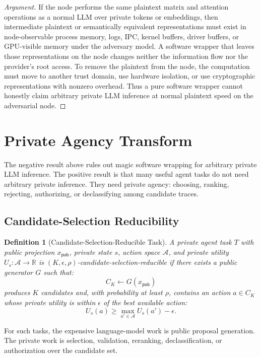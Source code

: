 \documentclass[11pt]{article}
\newtheorem{definition}{Definition}
\begin{document}
\begin{proof}[Argument]
If the node performs the same plaintext matrix and attention operations as a
normal LLM over private tokens or embeddings, then intermediate plaintext or
semantically equivalent representations must exist in node-observable process
memory, logs, IPC, kernel buffers, driver buffers, or GPU-visible memory under
the adversary model. A software wrapper that leaves those representations on
the node changes neither the information flow nor the provider's root access.
To remove the plaintext from the node, the computation must move to another
trust domain, use hardware isolation, or use cryptographic representations with
nonzero overhead. Thus a pure software wrapper cannot honestly claim arbitrary
private LLM inference at normal plaintext speed on the adversarial node.
\end{proof}

\section{Private Agency Transform}

The negative result above rules out magic software wrapping for arbitrary
private LLM inference. The positive result is that many useful agent tasks do
not need arbitrary private inference. They need private agency: choosing,
ranking, rejecting, authorizing, or declassifying among candidate traces.

\subsection{Candidate-Selection Reducibility}

\begin{definition}[Candidate-Selection-Reducible Task]
A private agent task \(T\) with public projection \(x_{\mathsf{pub}}\), private
state \(s\), action space \(\mathcal{A}\), and private utility
\(U_s:\mathcal{A}\rightarrow\mathbb{R}\) is
\((K,\epsilon,\rho)\)-candidate-selection-reducible if there exists a public
generator \(G\) such that:
\[
C_K \leftarrow G(x_{\mathsf{pub}})
\]
produces \(K\) candidates and, with probability at least \(\rho\), contains an
action \(a \in C_K\) whose private utility is within \(\epsilon\) of the best
available action:
\[
U_s(a) \geq \max_{a' \in \mathcal{A}} U_s(a') - \epsilon.
\]
\end{definition}

For such tasks, the expensive language-model work is public proposal
generation. The private work is selection, validation, reranking,
declassification, or authorization over the candidate set.
\end{document}
